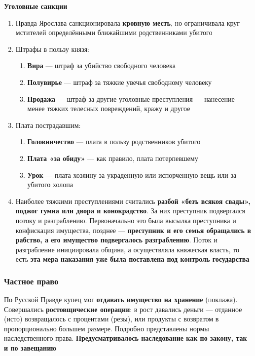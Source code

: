 \documentclass{article}
\begin{document}
\textbf{Уголовные санкции}

\begin{enumerate}
    \item Правда Ярослава санкционировала \textbf{кровную месть}, но ограничивала круг мстителей определёнными ближайшими родственниками убитого
    \item Штрафы в пользу князя:
    \begin{enumerate}
        \item \textbf{Вира} — штраф за убийство свободного человека
        \item \textbf{Полувирье} — штраф за тяжкие увечья свободному человеку
        \item \textbf{Продажа} — штраф за другие уголовные преступления — нанесение менее тяжких телесных повреждений, кражу и другое
    \end{enumerate}
    \item Плата пострадавшим:
    \begin{enumerate}
        \item \textbf{Головничество} — плата в пользу родственников убитого
        \item \textbf{Плата «за обиду»} — как правило, плата потерпевшему
        \item \textbf{Урок} — плата хозяину за украденную или испорченную вещь или за убитого холопа
    \end{enumerate}
    \item Наиболее тяжкими преступлениями считались \textbf{разбой «безъ всякоя свады», поджог гумна или двора и конокрадство}. За них преступник подвергался потоку и разграблению. Первоначально это была высылка преступника и конфискация имущества, позднее — \textbf{преступник и его семья обращались в рабство, а его имущество подвергалось разграблению}. Поток и разграбление инициировала община, а осуществляла княжеская власть, то есть \textbf{эта мера наказания уже была поставлена под контроль государства}
\end{enumerate}

\subsubsection{Частное право}

По Русской Правде купец мог \textbf{отдавать имущество на хранение} (поклажа). Совершались \textbf{ростовщические операции}: в рост давались деньги — отданное (исто) возвращалось с процентами (резы), или продукты с возвратом в пропорционально большем размере. Подробно представлены нормы наследственного права. \textbf{Предусматривалось наследование как по закону, так и по завещанию}
\end{document}
